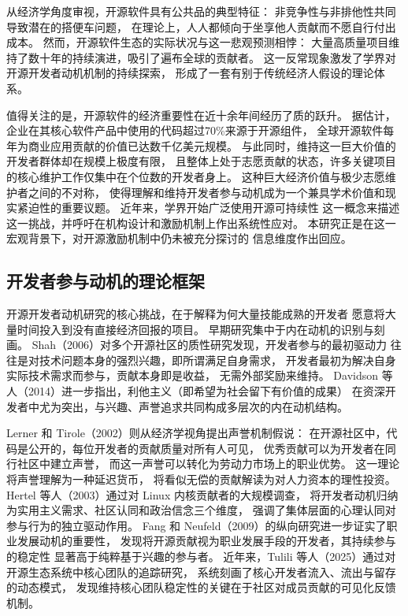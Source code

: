 \documentclass[
    type = master, %
    degree = professional,        %
    decl-page,  %
    twoside,                %
    fontset = fandol %
  ]{njuthesis}
\begin{document}
从经济学角度审视，开源软件具有公共品的典型特征：
非竞争性与非排他性共同导致潜在的搭便车问题，
在理论上，人人都倾向于坐享他人贡献而不愿自行付出成本\cite{lerner2002simple}。
然而，开源软件生态的实际状况与这一悲观预测相悖：
大量高质量项目维持了数十年的持续演进，吸引了遍布全球的贡献者。
这一反常现象激发了学界对开源开发者动机机制的持续探索\cite{gerosa2021shifting}，
形成了一套有别于传统经济人假设的理论体系。

值得关注的是，开源软件的经济重要性在近十余年间经历了质的跃升。
据估计，企业在其核心软件产品中使用的代码超过70\%来源于开源组件，
全球开源软件每年为商业应用贡献的价值已达数千亿美元规模。
与此同时，维持这一巨大价值的开发者群体却在规模上极度有限，
且整体上处于志愿贡献的状态，许多关键项目的核心维护工作仅集中在个位数的开发者身上\cite{lu2021core,jamieson2024predicting}。
这种巨大经济价值与极少志愿维护者之间的不对称，
使得理解和维持开发者参与动机成为一个兼具学术价值和现实紧迫性的重要议题。
近年来，学界开始广泛使用开源可持续性
这一概念来描述这一挑战，并呼吁在机构设计和激励机制上作出系统性应对\cite{alami2024sustainability,wang2025opensource,qi2021opensource}。
本研究正是在这一宏观背景下，对开源激励机制中仍未被充分探讨的
信息维度作出回应。

\subsection{开发者参与动机的理论框架}

开源开发者动机研究的核心挑战，在于解释为何大量技能成熟的开发者
愿意将大量时间投入到没有直接经济回报的项目。
早期研究集中于内在动机的识别与刻画。
Shah（2006）对多个开源社区的质性研究发现，开发者参与的最初驱动力
往往是对技术问题本身的强烈兴趣，即所谓满足自身需求，
开发者最初为解决自身实际技术需求而参与，贡献本身即是收益，
无需外部奖励来维持\cite{shah2006motivation}。
Davidson 等人（2014）进一步指出，利他主义（即希望为社会留下有价值的成果）
在资深开发者中尤为突出，与兴趣、声誉追求共同构成多层次的内在动机结构\cite{davidson2014older}。

Lerner 和 Tirole（2002）则从经济学视角提出声誉机制假说：
在开源社区中，代码是公开的，每位开发者的贡献质量对所有人可见，
优秀贡献可以为开发者在同行社区中建立声誉，
而这一声誉可以转化为劳动力市场上的职业优势\cite{lerner2002simple}。
这一理论将声誉理解为一种延迟货币，
将看似无偿的贡献解读为对人力资本的理性投资。
Hertel 等人（2003）通过对 Linux 内核贡献者的大规模调查，
将开发者动机归纳为实用主义需求、社区认同和政治信念三个维度，
强调了集体层面的心理认同对参与行为的独立驱动作用\cite{hertel2003motivation}。
Fang 和 Neufeld（2009）的纵向研究进一步证实了职业发展动机的重要性，
发现将开源贡献视为职业发展手段的开发者，其持续参与的稳定性
显著高于纯粹基于兴趣的参与者\cite{fang2009understanding}。
近年来，Tulili 等人（2025）通过对开源生态系统中核心团队的追踪研究，
系统刻画了核心开发者流入、流出与留存的动态模式，
发现维持核心团队稳定性的关键在于社区对成员贡献的可见化反馈机制\cite{tulili2025exploring}。
\end{document}
